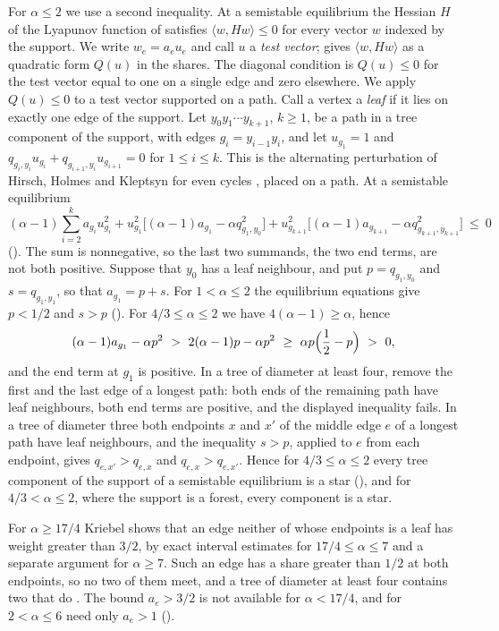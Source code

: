 \documentclass[11pt]{article}
\theoremstyle{definition}
\theoremstyle{remark}
\begin{document}
For $\alpha\le 2$ we use a second inequality. At a semistable equilibrium the Hessian $H$ of the Lyapunov function
of \cite{vdHHKR} satisfies $\langle w,Hw\rangle\le 0$ for every vector $w$ indexed by the support. We write
$w_e=a_eu_e$ and call $u$ a \emph{test vector};  gives $\langle w,Hw\rangle$ as a quadratic form $Q(u)$
in the shares. The diagonal condition is $Q(u)\le 0$ for the test vector equal to one on a single edge and zero
elsewhere. We apply $Q(u)\le 0$ to a test vector supported on a path. Call a vertex a \emph{leaf} if it lies on exactly
one edge of the support. Let $y_0y_1\cdots y_{k+1}$, $k\ge 1$, be a path in a tree component of the support, with
edges $g_i=y_{i-1}y_i$, and let $u_{g_1}=1$ and $q_{g_i,y_i}u_{g_i}+q_{g_{i+1},y_i}u_{g_{i+1}}=0$ for $1\le i\le k$.
This is the alternating perturbation of Hirsch, Holmes and Kleptsyn for even cycles \cite[Lemma~2]{HHK}, placed on a
path. At a semistable equilibrium
\[
  (\alpha-1)\sum_{i=2}^{k}a_{g_i}u_{g_i}^2
  +u_{g_1}^2\bigl[(\alpha-1)a_{g_1}-\alpha q_{g_1,y_0}^2\bigr]
  +u_{g_{k+1}}^2\bigl[(\alpha-1)a_{g_{k+1}}-\alpha q_{g_{k+1},y_{k+1}}^2\bigr]\ \le\ 0
\]
(). The sum is nonnegative, so the last two summands, the two end terms, are not both positive.
Suppose that $y_0$ has a leaf neighbour, and put $p=q_{g_1,y_0}$ and $s=q_{g_1,y_1}$, so that $a_{g_1}=p+s$. For
$1<\alpha\le 2$ the equilibrium equations give $p<1/2$ and $s>p$ (). For $4/3\le\alpha\le 2$ we
have $4(\alpha-1)\ge\alpha$, hence
\[
  (\alpha-1)a_{g_1}-\alpha p^2\ >\ 2(\alpha-1)p-\alpha p^2\ \ge\ \alpha p\Bigl(\frac12-p\Bigr)\ >\ 0 ,
\]
and the end term at $g_1$ is positive. In a tree of diameter at least four, remove the first and the last edge of a
longest path: both ends of the remaining path have leaf neighbours, both end terms are positive, and the displayed
inequality fails. In a tree of diameter three both endpoints $x$ and $x'$ of the middle edge $e$ of a longest path
have leaf neighbours, and the inequality $s>p$, applied to $e$ from each endpoint, gives $q_{e,x'}>q_{e,x}$ and
$q_{e,x}>q_{e,x'}$. Hence for $4/3\le\alpha\le 2$ every tree component of the support of a semistable equilibrium is
a star (), and for $4/3<\alpha\le 2$, where the support is a forest, every component is a star.

For $\alpha\ge 17/4$ Kriebel shows that an edge neither of whose
endpoints is a leaf has weight greater than $3/2$, by exact interval estimates for $17/4\le\alpha\le 7$ and a separate
argument for $\alpha\ge 7$. Such an edge has a share greater than $1/2$ at both endpoints, so no two of them meet, and
a tree of diameter at least four contains two that do \cite[Section~4]{Kr}. The bound $a_e>3/2$ is not available for
$\alpha<17/4$, and for $2<\alpha\le 6$  need only $a_e>1$ ().
\end{document}
